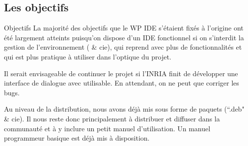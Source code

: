 \subsection{Les objectifs}

    \begin{frame}{Objectifs}
        La majorité des objectifs que le WP IDE s'étaient fixés à l'origine ont été largement atteints puisqu'on dispose d'un IDE fonctionnel si on s'interdit la gestion de l'environnement ( \& cie),  qui reprend \coqide avec plus de fonctionnalités et qui est plus pratique à utiliser dans l'optique du projet.

        Il serait envisageable de continuer le projet si l'INRIA finit de développer une interface de dialogue avec \coq utilisable.
En attendant, on ne peut que corriger les bugs.

        Au niveau de la distribution, nous avons déjà mis \coquille sous forme de paquets (``.deb" \& cie). Il nous reste donc principalement à distribuer et diffuser \coquille dans la communauté \coq et à y inclure un petit manuel d'utilisation. Un manuel programmeur basique est déjà mis à disposition.
    \end{frame}

